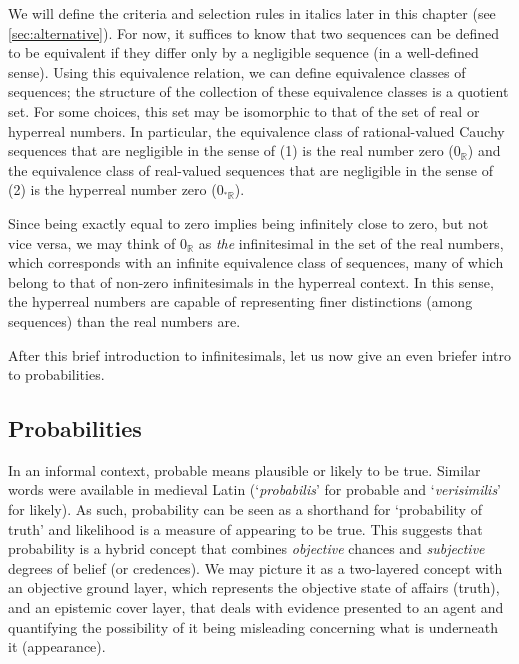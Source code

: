 We will define the criteria and selection rules in italics later in this chapter (see \autoref{sec:alternative}). For now, it suffices to know that two sequences can be defined to be equivalent if they differ only by a negligible sequence (in a well-defined sense). Using this equivalence relation, we can define equivalence classes of sequences; the structure of the collection of these equivalence classes is a quotient set. For some choices, this set may be isomorphic to that of the set of real or hyperreal numbers. In particular, the equivalence class of rational-valued Cauchy sequences that are negligible in the sense of (1) is the real number zero ($0_\mathbb{R}$) and the equivalence class of real-valued sequences that are negligible in the sense of (2) is the hyperreal number zero ($0_{{^*} \mathbb{R}}$).

Since being exactly equal to zero implies being infinitely close to zero, but not vice versa, we may think of $0_\mathbb{R}$ as \emph{the} infinitesimal in the set of the real numbers, which corresponds with an infinite equivalence class of sequences, many of which belong to that of non-zero infinitesimals in the hyperreal context.
In this sense, the hyperreal numbers are capable of representing finer distinctions (among sequences) than the real numbers are.

After this brief introduction to infinitesimals, let us now give an even briefer intro to probabilities.

\subsection*{Probabilities}
In an informal context, probable means plausible or likely to be true. Similar words were available in medieval Latin (`\textit{probabilis}' for probable and `\textit{verisimilis}' for likely). As such, probability can be seen as a shorthand for `probability of truth' and likelihood is a measure of appearing to be true. This suggests that probability is a hybrid concept that combines \emph{objective} chances and \emph{subjective} degrees of belief (or credences). We may picture it as a two-layered concept with an objective ground layer, which represents the objective state of affairs (truth), and an epistemic cover layer, that deals with evidence presented to an agent and quantifying the possibility of it being misleading concerning what is underneath it (appearance).

